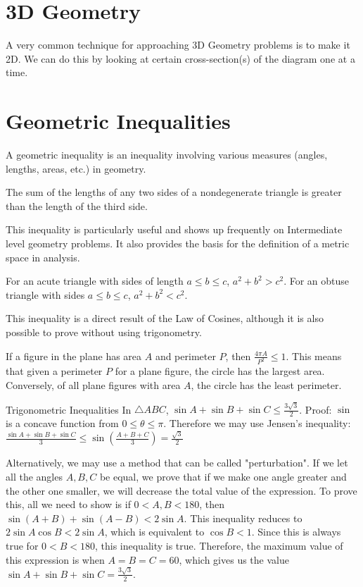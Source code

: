 \section{3D Geometry}
A very common technique for approaching 3D Geometry problems is to make it 2D. We can do this by looking at certain cross-section(s) of the diagram one at a time.

\section{Geometric Inequalities}
A geometric inequality is an inequality involving various measures (angles, lengths, areas, etc.) in geometry.

\begin{theorem}
The sum of the lengths of any two sides of a nondegenerate triangle is greater than the length of the third side.
\end{theorem}

This inequality is particularly useful and shows up frequently on Intermediate level geometry problems. It also provides the basis for the definition of a metric space in analysis.

\begin{theorem}
For an acute triangle with sides of length $a \leq b \leq c$, $a^2+b^2>c^2$. For an obtuse triangle with sides $a \leq b \leq c$, $a^2+b^2<c^2$.
\end{theorem}

This inequality is a direct result of the Law of Cosines, although it is also possible to prove without using trigonometry.

\begin{theorem}
If a figure in the plane has area $A$ and perimeter $P$, then $\frac{4\pi A}{P^2} \le 1$. This means that given a perimeter $P$ for a plane figure, the circle has the largest area. Conversely, of all plane figures with area $A$, the circle has the least perimeter.
\end{theorem}


Trigonometric Inequalities
In $\triangle ABC$, $\sin{A}+\sin{B}+\sin{C}\le \frac{3\sqrt{3}}{2}$.
Proof: $\sin$ is a concave function from $0\le \theta \le \pi$. Therefore we may use Jensen's inequality: $\frac{\sin{A}+\sin{B}+\sin{C}}{3}\le \sin{\left(\frac{A+B+C}{3}\right)}=\frac{\sqrt{3}}{2}$

Alternatively, we may use a method that can be called "perturbation". If we let all the angles $A,B,C$ be equal, we prove that if we make one angle greater and the other one smaller, we will decrease the total value of the expression. To prove this, all we need to show is if $0<A,B<180$, then $\sin(A+B)+\sin(A-B)<2\sin A$. This inequality reduces to $2\sin A \cos B<2\sin A$, which is equivalent to $\cos B<1$. Since this is always true for $0<B<180$, this inequality is true. Therefore, the maximum value of this expression is when $A=B=C=60$, which gives us the value $\sin{A}+\sin{B}+\sin {C}=\frac{3\sqrt{3}}{2}$.

